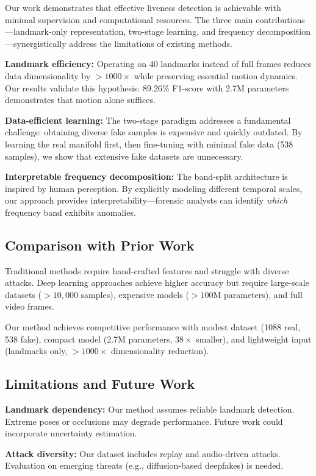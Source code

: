 \documentclass[11pt,twocolumn]{article}
\begin{document}
Our work demonstrates that effective liveness detection is achievable with minimal supervision and computational resources. The three main contributions—landmark-only representation, two-stage learning, and frequency decomposition—synergistically address the limitations of existing methods.

\textbf{Landmark efficiency:} Operating on 40 landmarks instead of full frames reduces data dimensionality by $>1000\times$ while preserving essential motion dynamics. Our results validate this hypothesis: 89.26\% F1-score with 2.7M parameters demonstrates that motion alone suffices.

\textbf{Data-efficient learning:} The two-stage paradigm addresses a fundamental challenge: obtaining diverse fake samples is expensive and quickly outdated. By learning the real manifold first, then fine-tuning with minimal fake data (538 samples), we show that extensive fake datasets are unnecessary.

\textbf{Interpretable frequency decomposition:} The band-split architecture is inspired by human perception. By explicitly modeling different temporal scales, our approach provides interpretability—forensic analysts can identify \emph{which} frequency band exhibits anomalies.

\subsection{Comparison with Prior Work}

Traditional methods require hand-crafted features and struggle with diverse attacks. Deep learning approaches achieve higher accuracy but require large-scale datasets ($>10,000$ samples), expensive models ($>100$M parameters), and full video frames.

Our method achieves competitive performance with modest dataset (1088 real, 538 fake), compact model (2.7M parameters, $38\times$ smaller), and lightweight input (landmarks only, $>1000\times$ dimensionality reduction).

\subsection{Limitations and Future Work}

\textbf{Landmark dependency:} Our method assumes reliable landmark detection. Extreme poses or occlusions may degrade performance. Future work could incorporate uncertainty estimation.

\textbf{Attack diversity:} Our dataset includes replay and audio-driven attacks. Evaluation on emerging threats (e.g., diffusion-based deepfakes) is needed.
\end{document}

